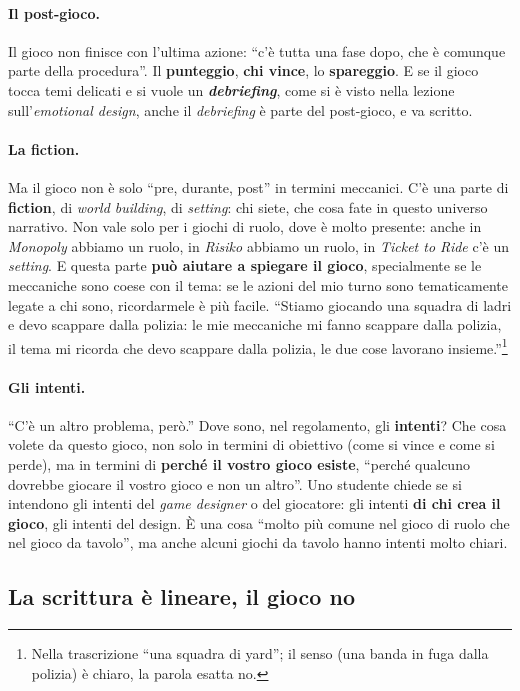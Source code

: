 \paragraph{Il post-gioco.} Il gioco non finisce con l'ultima azione: ``c'è tutta una fase
dopo, che è comunque parte della procedura''. Il \textbf{punteggio}, \textbf{chi vince},
lo \textbf{spareggio}. E se il gioco tocca temi delicati e si vuole un
\textbf{\emph{debriefing}}, come si è visto nella lezione sull'\emph{emotional design},
anche il \emph{debriefing} è parte del post-gioco, e va scritto.

\paragraph{La fiction.} Ma il gioco non è solo ``pre, durante, post'' in termini
meccanici. C'è una parte di \textbf{fiction}, di \emph{world building}, di
\emph{setting}: chi siete, che cosa fate in questo universo narrativo. Non vale solo per i
giochi di ruolo, dove è molto presente: anche in \emph{Monopoly} abbiamo un ruolo, in
\emph{Risiko} abbiamo un ruolo, in \emph{Ticket to Ride} c'è un \emph{setting}. E questa
parte \textbf{può aiutare a spiegare il gioco}, specialmente se le meccaniche sono coese
con il tema: se le azioni del mio turno sono tematicamente legate a chi sono,
ricordarmele è più facile. ``Stiamo giocando una squadra di ladri e devo scappare dalla
polizia: le mie meccaniche mi fanno scappare dalla polizia, il tema mi ricorda che devo
scappare dalla polizia, le due cose lavorano insieme.''\footnote{Nella trascrizione ``una
squadra di yard''; il senso (una banda in fuga dalla polizia) è chiaro, la parola
esatta no.}

\paragraph{Gli intenti.} ``C'è un altro problema, però.'' Dove sono, nel regolamento, gli
\textbf{intenti}? Che cosa volete da questo gioco, non solo in termini di obiettivo (come
si vince e come si perde), ma in termini di \textbf{perché il vostro gioco esiste},
``perché qualcuno dovrebbe giocare il vostro gioco e non un altro''. Uno studente chiede
se si intendono gli intenti del \emph{game designer} o del giocatore: gli intenti
\textbf{di chi crea il gioco}, gli intenti del design. È una cosa ``molto più comune nel
gioco di ruolo che nel gioco da tavolo'', ma anche alcuni giochi da tavolo hanno intenti
molto chiari.

\subsection{La scrittura è lineare, il gioco no}
\label{a12:sec:lineare}

